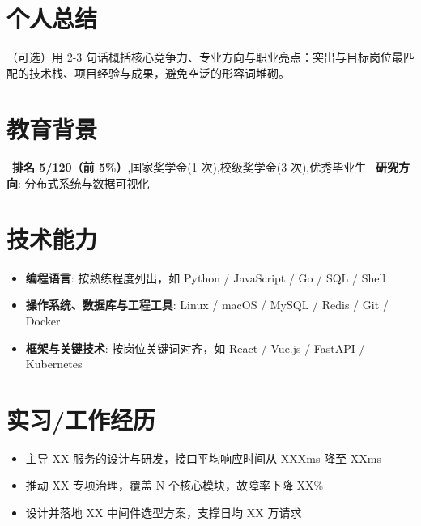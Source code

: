 \documentclass{resume}
\begin{document}



\section{个人总结}
（可选）用 2-3 句话概括核心竞争力、专业方向与职业亮点：突出与目标岗位最匹配的技术栈、项目经验与成果，避免空泛的形容词堆砌。

\section{教育背景}
\ \textbf{排名 5/120（前 5\%）},国家奖学金(1 次),校级奖学金(3 次),优秀毕业生
\ \textbf{研究方向}: 分布式系统与数据可视化

\section{技术能力}
\begin{itemize}[parsep=0.2ex]
  \item \textbf{编程语言}: 按熟练程度列出，如 Python / JavaScript / Go / SQL / Shell
  \item \textbf{操作系统、数据库与工程工具}: Linux / macOS / MySQL / Redis / Git / Docker
  \item \textbf{框架与关键技术}: 按岗位关键词对齐，如 React / Vue.js / FastAPI / Kubernetes
\end{itemize}

\section{实习/工作经历}
\begin{itemize}
  \item 主导 XX 服务的设计与研发，接口平均响应时间从 XXXms 降至 XXms
  \item 推动 XX 专项治理，覆盖 N 个核心模块，故障率下降 XX\%
  \item 设计并落地 XX 中间件选型方案，支撑日均 XX 万请求
\end{itemize}
\end{document}
